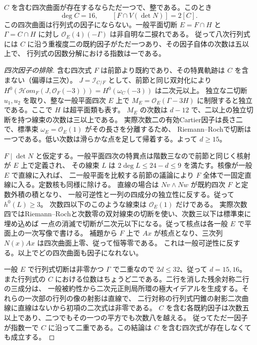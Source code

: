 \begin{theorem}\label{thm:cofactor-quartic-contact}
$C$ を含む四次曲面が存在するならただ一つで、整である。このとき
\[
        \deg C=16,\qquad [F\cap V(\det N)]=2[C] .
\]
この四次曲面は行列式の因子にならない。一般平面切断 $E=F\cap H$ と $\Gamma=C\cap H$ に対し
$\mathcal O_E(4)(-\Gamma)$ は非自明な二捩れである。
従って八次行列式には $C$ に沿う重複度二の既約因子がただ一つあり、その因子自体の次数は五以上で、
行列式の因数分解における指数は一である。
\end{theorem}
\begin{proof}[四次因子の排除]
含む四次式 $F$ は前節より既約であり、その特異軌跡は $C$ を含まない（偏導は三次）。
$J=\mathcal I_{C/F}$ として、前節と同じ双対化により
$H^0(\mathcal Hom_F(J,\mathcal O_F(-3)))=H^0(\omega_C(-3))$ は二次元以上。
独立な二切断 $u_1,u_2$ を取り、整な一般平面四次 $E$ 上で
$M_E=\mathcal O_E(\Gamma-3H)$ に制限すると独立である。ここで $H$ は超平面類も表す。
$M_E$ の次数は $d-12$ で、二以上の独立切断を持つ線束の次数は三以上である。
実際次数二の有効Cartier因子は長さ二で、標準束 $\omega_E=\mathcal O_E(1)$ がその長さを分離するため、
Riemann--Rochで切断は一つである。低い次数は滑らかな点を足して帰着する。よって $d\ge15$。

$F\mid\det N$ と仮定する。一般平面四次の特異点は階数三なので前節と同じく核射が $E$ 上で定義され、
その線束 $L$ は $2\deg L\le24-d\le9$ を満たす。核像が一般 $E$ で直線に入れば、
二一般平面を比較する前節の議論により $F$ 全体で一固定直線に入る。定数核も同様に除ける。
直線の場合は $Nv\wedge Nw$ が既約四次 $F$ と定数外積の積となり、
一般可逆性と一列の四成分の独立性に反する。従って $h^0(L)\ge3$。
次数四以下のこのような線束は $\mathcal O_E(1)$ だけである。
実際次数四ではRiemann--Rochと次数零の双対線束の切断を使い、次数三以下は標準束に埋め込めば
一点の消滅で切断が二次元以下になる。従って核点は各一般 $E$ で平面上の一次写像で書ける。
補題から $F$ 上で $Ax$ が核点となり、三次列 $N(x)Ax$ は四次曲面上零、従って恒等零である。
これは一般可逆性に反する。以上でどの四次曲面も因子になれない。

一般 $E$ で行列式切断は非零かつ $\Gamma$ で二重なので $2d\le32$、従って $d=15,16$。
また行列式の $C$ における位数はちょうど二である。二行を消した残余対称二行の三成分は、
一般被約性から二次元正則局所環の極大イデアルを生成する。それらの一次部の行列の像の射影は直線で、
二行対称の行列式円錐の射影二次曲線に直線はないから初項の二次式は非零である。
$C$ を含む各既約因子は次数五以上であり、二つでもその一つの平方でも次数八を越える。
従ってただ一因子が指数一で $C$ に沿って二重である。この結論は $C$ を含む四次式が存在しなくても成立する。
\end{proof}

